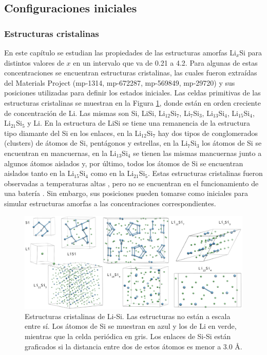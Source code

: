 \subsection{Configuraciones iniciales}

\subsubsection{Estructuras cristalinas}

En este capítulo se estudian las propiedades de las estructuras amorfas Li$_x$Si
para distintos valores de $x$ en un intervalo que va de 0.21 a 4.2. Para algunas de
estas concentraciones se encuentran estructuras cristalinas, las cuales 
fueron extraídas del Materials Project \cite{materials_project} 
(mp-1314, mp-672287, mp-569849, mp-29720) y sus posiciones utilizadas para definir
los estados iniciales. Las celdas primitivas de las estructuras cristalinas se
muestran en la Figura \ref{fig:cristalinas}, donde están en orden creciente de 
concentración de Li. Las mismas son Si, LiSi, Li$_{12}$Si$_7$, Li$_7$Si$_3$, 
Li$_{13}$Si$_4$, Li$_{15}$Si$_4$, Li$_{21}$Si$_5$ y Li. En la estructura de LiSi
se tiene una remanencia de la estructura tipo diamante del Si en los enlaces, en la Li$_{12}$Si$_7$ 
hay dos tipos de conglomerados (clusters) de átomos de Si, pentágonos y estrellas, en la
Li$_7$Si$_3$ los átomos de Si se encuentran en mancuernas, en la Li$_{13}$Si$_4$ 
se tienen las mismas mancuernas junto a algunos átomos aislados y, por último, 
todos los átomos de Si se encuentran aislados tanto en la Li$_{15}$Si$_{4}$ como
en la Li$_{21}$Si$_5$. Estas estructuras cristalinas fueron observadas a 
temperaturas altas \cite{wen1981}, pero no se encuentran en el funcionamiento de
una batería \cite{obrovac2004}. Sin embargo, sus posiciones pueden tomarse como 
iniciales para simular estructuras amorfas a las concentraciones correspondientes.
\begin{figure}[h!]
    \centering
    \includegraphics[width=\textwidth]{Silicio/caracterizacion/metodos/config/cristalinas.png}
    \caption{Estructuras cristalinas de Li-Si. Las estructuras no están a escala 
    entre sí. Los átomos de Si se muestran en azul y los de Li en verde, mientras
    que la celda periódica en gris. Los enlaces de Si-Si están graficados si la 
    distancia entre dos de estos átomos es menor a 3.0 \AA.}
    \label{fig:cristalinas}
\end{figure}


